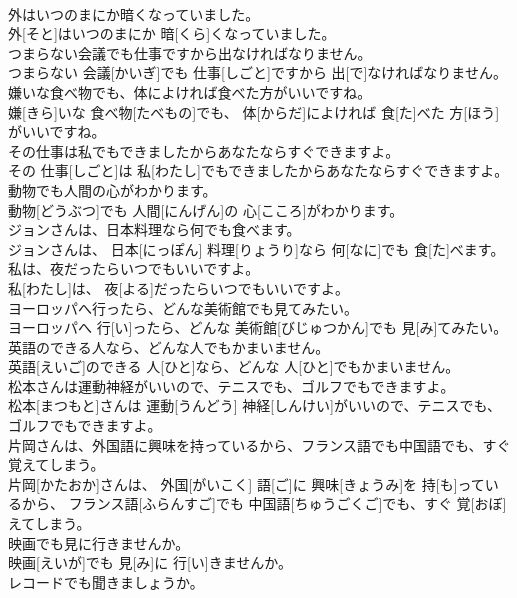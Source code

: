 \documentclass[8pt]{extreport}
\begin{document}
\begin{CJK}{UTF8}{min}
\\	外はいつのまにか暗くなっていました。	
\\	外[そと]はいつのまにか 暗[くら]くなっていました。	
\\	つまらない会議でも仕事ですから出なければなりません。	
\\	つまらない 会議[かいぎ]でも 仕事[しごと]ですから 出[で]なければなりません。	
\\	嫌いな食べ物でも、体によければ食べた方がいいですね。	
\\	嫌[きら]いな 食べ物[たべもの]でも、 体[からだ]によければ 食[た]べた 方[ほう]がいいですね。	
\\	その仕事は私でもできましたからあなたならすぐできますよ。	
\\	その 仕事[しごと]は 私[わたし]でもできましたからあなたならすぐできますよ。	
\\	動物でも人間の心がわかります。	
\\	動物[どうぶつ]でも 人間[にんげん]の 心[こころ]がわかります。	
\\	ジョンさんは、日本料理なら何でも食べます。	
\\	ジョンさんは、 日本[にっぽん] 料理[りょうり]なら 何[なに]でも 食[た]べます。	
\\	私は、夜だったらいつでもいいですよ。	
\\	私[わたし]は、 夜[よる]だったらいつでもいいですよ。	
\\	ヨーロッパへ行ったら、どんな美術館でも見てみたい。	
\\	ヨーロッパへ 行[い]ったら、どんな 美術館[びじゅつかん]でも 見[み]てみたい。	
\\	英語のできる人なら、どんな人でもかまいません。	
\\	英語[えいご]のできる 人[ひと]なら、どんな 人[ひと]でもかまいません。	
\\	松本さんは運動神経がいいので、テニスでも、ゴルフでもできますよ。	
\\	松本[まつもと]さんは 運動[うんどう] 神経[しんけい]がいいので、テニスでも、ゴルフでもできますよ。	
\\	片岡さんは、外国語に興味を持っているから、フランス語でも中国語でも、すぐ覚えてしまう。	
\\	片岡[かたおか]さんは、 外国[がいこく] 語[ご]に 興味[きょうみ]を 持[も]っているから、 フランス語[ふらんすご]でも 中国語[ちゅうごくご]でも、すぐ 覚[おぼ]えてしまう。	
\\	映画でも見に行きませんか。	
\\	映画[えいが]でも 見[み]に 行[い]きませんか。	
\\	レコードでも聞きましょうか。	

\end{CJK}
\end{document}

